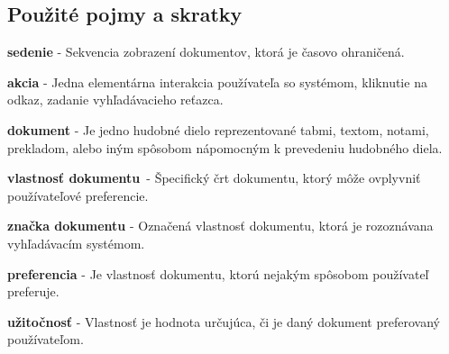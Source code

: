 \newpage
\subsection{Použité pojmy a skratky}

\begin{my_description}
\item \textbf{sedenie} - Sekvencia zobrazení dokumentov, ktorá je časovo ohraničená.
\item \textbf{akcia} - Jedna elementárna interakcia používateľa so systémom,
    kliknutie na odkaz, zadanie vyhľadávacieho reťazca.
\item \textbf{dokument} - Je jedno hudobné dielo reprezentované tabmi,
    textom, notami, prekladom, alebo iným spôsobom nápomocným k
    prevedeniu hudobného diela.
\item \textbf{vlastnosť dokumentu} - Špecifický črt dokumentu, ktorý
    môže ovplyvniť používateľové preferencie.
\item \textbf{značka dokumentu} - Označená vlastnosť dokumentu, ktorá
    je rozoznávana vyhľadávacím systémom.
\item \textbf{preferencia} - Je vlastnosť dokumentu, ktorú nejakým spôsobom používateľ preferuje.
\item \textbf{užitočnosť} - Vlastnosť je hodnota určujúca, či je daný dokument preferovaný
    používateľom.
\end{my_description}

